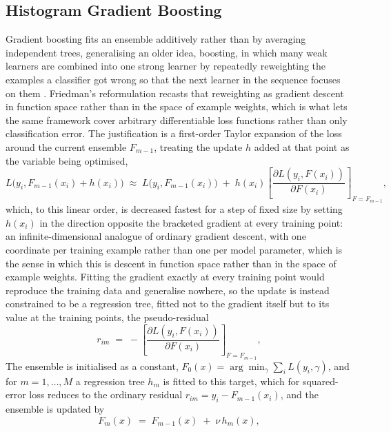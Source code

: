 \documentclass[12pt,a4paper]{report}
\begin{document}
\subsection{Histogram Gradient Boosting}

Gradient boosting \citep{friedman2001gradient} fits an ensemble additively
rather than by averaging independent trees, generalising an older idea,
boosting, in which many weak learners are combined into one strong learner
by repeatedly reweighting the examples a classifier got wrong so that the
next learner in the sequence focuses on them \citep{freund1997adaboost}.
Friedman's reformulation recasts that reweighting as gradient descent in
function space rather than in the space of example weights, which is what
lets the same framework cover arbitrary differentiable loss functions rather
than only classification error. The justification is a first-order Taylor
expansion of the loss around the current ensemble $F_{m-1}$, treating the
update $h$ added at that point as the variable being optimised,
\begin{equation}
L\big(y_i, F_{m-1}(x_i) + h(x_i)\big) \;\approx\; L\big(y_i, F_{m-1}(x_i)\big)
\;+\; h(x_i)\left[\frac{\partial L(y_i,F(x_i))}{\partial F(x_i)}\right]_{F=F_{m-1}},
\label{eq:boost-taylor}
\end{equation}
which, to this linear order, is decreased fastest for a step of fixed size
by setting $h(x_i)$ in the direction opposite the bracketed gradient at
every training point: an infinite-dimensional analogue of ordinary gradient
descent, with one coordinate per training example rather than one per
model parameter, which is the sense in which this is descent in function
space rather than in the space of example weights. Fitting the gradient
exactly at every training point would reproduce the training data and
generalise nowhere, so the update is instead constrained to be a regression
tree, fitted not to the gradient itself but to its value at the training
points, the pseudo-residual
\begin{equation}
r_{im} \;=\; -\left[\frac{\partial L(y_i,F(x_i))}{\partial F(x_i)}\right]_{F=F_{m-1}},
\label{eq:grad-residual}
\end{equation}
The ensemble is initialised as a
constant, $F_0(x) = \arg\min_{\gamma} \sum_i L(y_i,\gamma)$, and for
$m = 1,\dots,M$ a regression tree $h_m$ is fitted to this target, which for
squared-error loss reduces to the ordinary residual
$r_{im} = y_i - F_{m-1}(x_i)$, and the ensemble is updated by
\begin{equation}
F_m(x) \;=\; F_{m-1}(x) \;+\; \nu\, h_m(x),
\label{eq:boost-update}
\end{equation}
\end{document}
